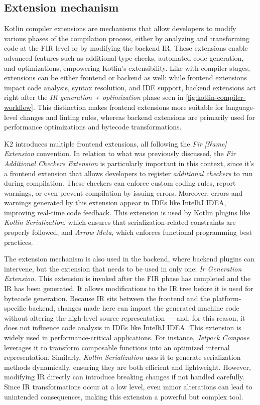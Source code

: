 \documentclass[12pt,a4paper,openright,twoside]{book}
\begin{document}
\subsection{Extension mechanism}

Kotlin compiler extensions are mechanisms that allow developers to modify
various phases of the compilation process, either by analyzing and transforming
code at the \ac{FIR} level or by modifying the backend \ac{IR}. These extensions
enable advanced features such as additional type checks, automated code
generation, and optimizations, empowering Kotlin’s extensibility.
%
Like with compiler stages, extensions can be either frontend or backend as well:
while frontend extensions impact code analysis, syntax resolution, and IDE
support, backend extensions act right after the \emph{IR generation +
optimization} phase seen in \cref{fig:kotlin-compiler-workflow}. This
distinction makes frontend extensions more suitable for language-level changes
and linting rules, whereas backend extensions are primarily used for performance
optimizations and bytecode transformations.

K2 introduces multiple frontend extensions, all following the
\emph{Fir [Name] Extension} convention. In relation to what was previously
discussed, the \emph{Fir Additional Checkers Extension} is particularly
important in this context, since it's a frontend extension that allows
developers to register \emph{additional checkers} to run during compilation.
These checkers can enforce custom coding rules, report warnings, or even prevent
compilation by issuing errors. Moreover, errors and warnings generated by this
extension appear in IDEs like IntelliJ IDEA, improving real-time code feedback.
This extension is used by Kotlin plugins like \emph{Kotlin Serialization},
which ensures that serialization-related constraints are properly followed, and
\emph{Arrow Meta}, which enforces functional programming best practices.

The extension mechanism is also used in the backend, where backend plugins can
intervene, but the extension that needs to be used in only one: \emph{Ir
Generation Extension}. This extension is invoked after the \ac{FIR} phase has
completed and the \ac{IR} has been generated. It allows modifications to the IR
tree before it is used for bytecode generation. Because IR sits between the
frontend and the platform-specific backend, changes made here can impact the
generated machine code without altering the high-level source representation ---
and, for this reason, it does not influence code analysis in \acp{IDE} like
IntelliJ IDEA. This extension is widely used in performance-critical
applications. For instance, \emph{Jetpack Compose} leverages it to transform
composable functions into an optimized internal representation. Similarly,
\emph{Kotlin Serialization} uses it to generate serialization methods
dynamically, ensuring they are both efficient and lightweight. However,
modifying \ac{IR} directly can introduce breaking changes if not handled
carefully. Since \ac{IR} transformations occur at a low level, even minor
alterations can lead to unintended consequences, making this extension a
powerful but complex tool.
\end{document}

